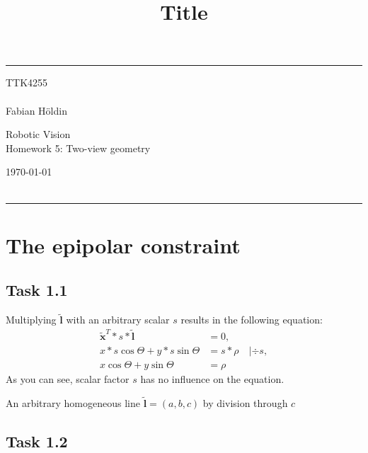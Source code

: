\documentclass[a4paper]{article} %
\begin{document}

    \title{Title} %
    \fancyhead[C]{}
    \hrule \medskip %
    \begin{minipage}{0.295\textwidth} %
        \raggedright
        TTK4255\\ %
        \footnotesize %
        \hfill\\
        Fabian Höldin %
    \end{minipage}
    \begin{minipage}{0.4\textwidth} %
        \centering
        \large %
        Robotic Vision\\ %
        \normalsize %
        Homework 5: Two-view geometry\\ %
    \end{minipage}
    \begin{minipage}{0.295\textwidth} %
        \raggedleft
        \today\\ %
        \footnotesize %
        \hfill\\
    \end{minipage}
    \medskip\hrule %

\section{The epipolar constraint}
    \subsection*{Task 1.1}
    Multiplying $\bm{\tilde{l}}$ with an arbitrary scalar $s$ results in the following equation:
    \begin{align*}
        \bm{\tilde{x}}^T * s * \bm{\tilde{l}} &= 0, \\
        x* s \cos{\Theta} + y* s \sin{\Theta} &= s* \rho \quad  | \div s , \\
        x \cos{\Theta} + y \sin{\Theta} &= \rho
    \end{align*}
    As you can see, scalar factor $s$ has no influence on the equation.

    An arbitrary homogeneous line $\bm{\tilde{l}} = (a, b, c)$ by division through $c$
    

    \subsection*{Task 1.2}
\end{document}
